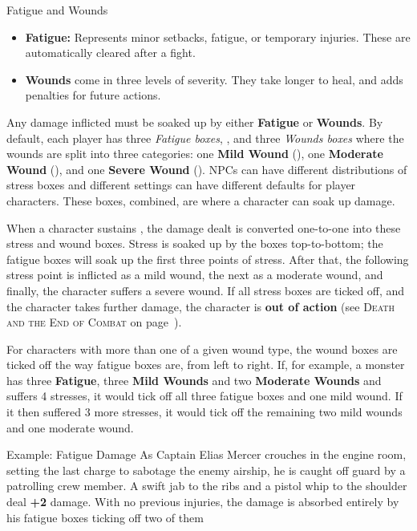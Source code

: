 \begin{multicols}{2}
\begin{Example}{Fatigue and Wounds}
	\begin{itemize}\raggedright
    	\item \textbf{Fatigue:} Represents minor setbacks, fatigue, or temporary injuries. These are automatically cleared after a fight.
	    \item \textbf{Wounds} come in three levels of severity. They take longer to heal, and adds penalties for future actions.
	\end{itemize}
\end{Example}

Any damage inflicted must be soaked up by either \textbf{Fatigue} or \textbf{Wounds}. By default, each player has three \emph{Fatigue boxes}, \FatigueBoxes, and three \emph{Wounds boxes} where the wounds are split into three categories: one \textbf{Mild Wound} (\MildWounds), one \textbf{Moderate Wound} (\ModerateWounds), and one \textbf{Severe Wound} (\SevereWounds). NPCs can have different distributions of stress boxes and different settings can have different defaults for player characters. These boxes, combined, are where a character can soak up damage.

\DamageBox

When a character sustains \Damage, the damage dealt is converted one-to-one into these stress and wound boxes. Stress is soaked up by the boxes top-to-bottom; the fatigue boxes will soak up the first three points of stress. After that, the following stress point is inflicted as a mild wound, the next as a moderate wound, and finally, the character suffers a severe wound. If all stress boxes are ticked off, and the character takes further damage, the character is \textbf{out of action} (see \textsc{Death and the End of Combat} on page~).

For characters with more than one of a given wound type, the wound boxes are ticked off the way fatigue boxes are, from left to right. If, for example, a monster has three \textbf{Fatigue}, three \textbf{Mild Wounds} and two \textbf{Moderate Wounds} and suffers 4 stresses, it would tick off all three fatigue boxes and one mild wound. If it then suffered 3 more stresses, it would tick off the remaining two mild wounds and one moderate wound.

  
\begin{Example}{Example: Fatigue Damage}
	As Captain Elias Mercer crouches in the engine room, setting the last charge to sabotage the enemy airship, he is caught off guard by a patrolling crew member. A swift jab to the ribs and a pistol whip to the shoulder deal \textbf{+2} damage. With no previous injuries, the damage is absorbed entirely by his fatigue boxes ticking off two of them
	

\end{Example}
\end{multicols}
